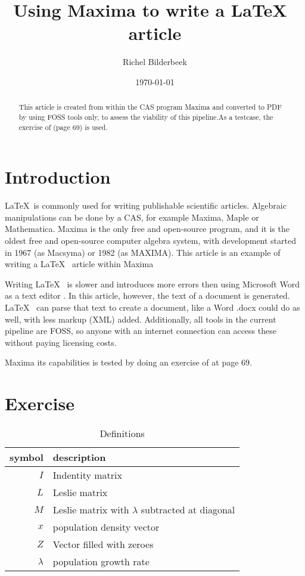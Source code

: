 \documentclass{article}
\title{Using Maxima to write a \LaTeX~ article}
\author{Richel Bilderbeek}
\date{\today}
\begin{document}
\maketitle

\begin{abstract}
This article is created from within the CAS program Maxima
and converted to PDF by using FOSS tools only, to assess the viability of this pipeline.As a testcase, the exercise of \cite{case2000} (page 69) is used.
\end{abstract}

\section{Introduction}

\LaTeX~is commonly used for writing publishable scientific articles\cite{gaudeul2006}.
Algebraic manipulations can be done by a CAS, for example Maxima, Maple or Mathematica.
Maxima is the only free and open-source program, and it is the oldest free and open-source computer algebra system, with development started in 1967 (as Macsyma) or 1982 (as MAXIMA).
This article is an example of writing a \LaTeX~ article within Maxima

Writing \LaTeX~ is slower and introduces more errors 
then using Microsoft Word as a text editor \cite{knauff&nejasmic2014}.
In this article, however, the text of a document is generated. \LaTeX~ can
parse that text to create a document, like a Word .docx could do as well,
with less markup (XML) added. Additionally, all tools in the current pipeline
are FOSS, so anyone with an internet connection can access these without
paying licensing costs.

Maxima its capabilities is tested by doing an exercise of \cite{case2000} at page 69.

\section{Exercise}

\begin{table}[here]
  \centering
  \begin{tabular}{ | r | l | }
    \hline
    symbol & description \\
    \hline
    $I$ & Indentity matrix \\
    $L$ & Leslie matrix \\
    $M$ & Leslie matrix with $\lambda$ subtracted at diagonal \\
    $x$ & population density vector \\
    $Z$ & Vector filled with zeroes \\
    $\lambda$ & population growth rate \\
    \hline
  \end{tabular}
  \caption{Definitions}
  \label{table:table_definition}
\end{table}
\end{document}
